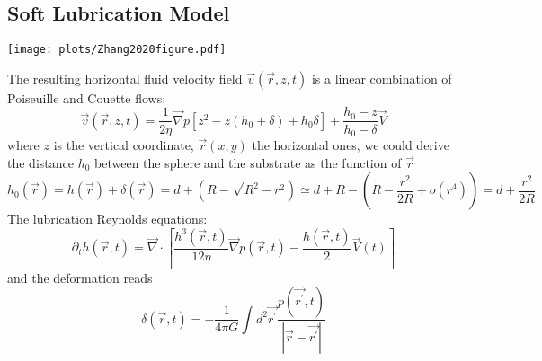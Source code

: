 \documentclass[books,12pt]{elegantpaper}
\newcommand{\ssc}{\subsection}
\begin{document}
\ssc{Soft Lubrication Model}

\begin{center}
\texttt{[image: plots/Zhang2020figure.pdf]}
\end{center}


The resulting horizontal fluid velocity field $\vec{v}(\vec{r},z,t)$ is a linear combination of Poiseuille and Couette flows:
\begin{equation} \vec{v}(\vec{r},z,t) = \frac{1}{2\eta} \vec\nabla p \left[ z^2 - z(h_0 + \delta) + h_0 \delta \right] + \frac{h_0 - z}{h_0 - \delta} \vec{V} \tag{Zhang2020.S1} \end{equation}
where $z$ is the vertical coordinate, $\vec{r}(x,y)$ the horizontal ones, we could derive the distance $h_0$ between the sphere and the substrate as the function of $\vec{r}$
$$ h_0 (\vec{r}) = h(\vec{r}) + \delta(\vec{r}) = d + (R - \sqrt{R^2 - r^2}) \simeq d + R - \left( R - \frac{r^2}{2R} + o(r^4) \right) = d + \frac{r^2}{2R} $$
The lubrication Reynolds equations:
\begin{equation} \partial_t h(\vec{r},t) = \vec\nabla \cdot \left[ \frac{h^3 (\vec{r},t)}{12 \eta} \vec\nabla p(\vec{r},t) - \frac{h(\vec{r},t)}{2} \vec{V}(t) \right] \tag{Zhang2020.S2} \label{Zhang2020.S2} \end{equation}
and the deformation reads
\begin{equation} \delta(\vec{r},t) = - \frac{1}{4\pi G} \int d^2 \vec{r^\prime} \frac{p(\vec{r^\prime},t)}{\left\vert \vec{r} - \vec{r^\prime} \right\vert} \tag{Zhang2020.S3} \label{Zhang2020.S3} \end{equation}
\end{document}
